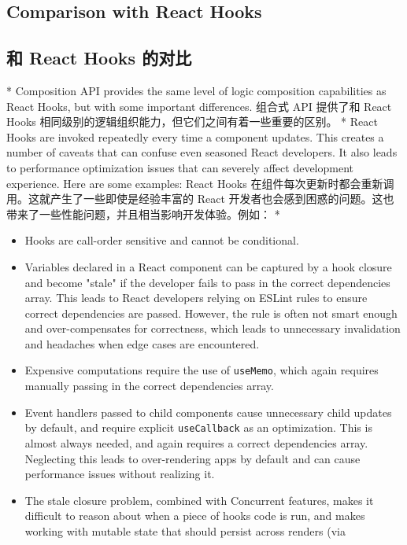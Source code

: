 \begin{paracol}{2}
\subsection{Comparison with React Hooks}
\switchcolumn
\subsection{和 React Hooks 的对比}
\switchcolumn[0]*%
Composition API provides the same level of logic composition
capabilities as React Hooks, but with some important differences.
\switchcolumn
组合式 API 提供了和 React Hooks
相同级别的逻辑组织能力，但它们之间有着一些重要的区别。
\switchcolumn[0]*%
React Hooks are invoked repeatedly every time a component updates. This
creates a number of caveats that can confuse even seasoned React
developers. It also leads to performance optimization issues that can
severely affect development experience. Here are some examples:
\switchcolumn
React Hooks 在组件每次更新时都会重新调用。这就产生了一些即使是经验丰富的
React
开发者也会感到困惑的问题。这也带来了一些性能问题，并且相当影响开发体验。例如：
\switchcolumn[0]*%
\begin{itemize}
\item
  Hooks are call-order sensitive and cannot be conditional.
\item
  Variables declared in a React component can be captured by a hook
  closure and become "stale" if the developer fails to pass in the
  correct dependencies array. This leads to React developers relying on
  ESLint rules to ensure correct dependencies are passed. However, the
  rule is often not smart enough and over-compensates for correctness,
  which leads to unnecessary invalidation and headaches when edge cases
  are encountered.
\item
  Expensive computations require the use of \texttt{useMemo}, which
  again requires manually passing in the correct dependencies array.
\item
  Event handlers passed to child components cause unnecessary child
  updates by default, and require explicit \texttt{useCallback} as an
  optimization. This is almost always needed, and again requires a
  correct dependencies array. Neglecting this leads to over-rendering
  apps by default and can cause performance issues without realizing it.
\item
  The stale closure problem, combined with Concurrent features, makes it
  difficult to reason about when a piece of hooks code is run, and makes
  working with mutable state that should persist across renders (via

\end{itemize}
\end{paracol}
